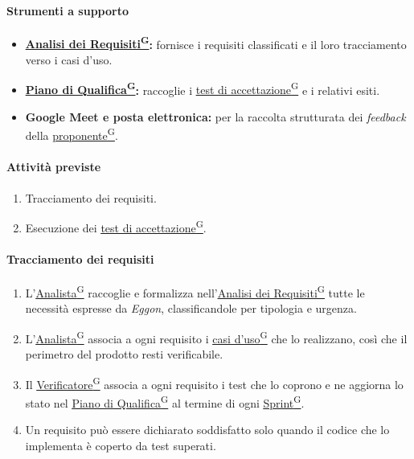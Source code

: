\documentclass[a4paper,12pt]{article}
\providecommand{\glslink}[2]{\href{https://alittlebyte-19.github.io/Documentazione/glossario.html\#gls-#1}{\underline{#2}\textsuperscript{\scriptsize G}}}
\begin{document}
\paragraph{Strumenti a supporto}
\begin{itemize}
    \item \textbf{\glslink{analisi-dei-requisiti-adr}{Analisi dei Requisiti}:} fornisce i requisiti classificati e il loro tracciamento verso i casi d'uso.
    \item \textbf{\glslink{piano-di-qualifica}{Piano di Qualifica}:} raccoglie i \glslink{test-di-accettazione}{test di accettazione} e i relativi esiti.
    \item \textbf{Google Meet e posta elettronica:} per la raccolta strutturata dei \textit{feedback} della \glslink{committente-proponente}{proponente}.
\end{itemize}

\paragraph{Attività previste}
\begin{enumerate}
    \item Tracciamento dei requisiti.
    \item Esecuzione dei \glslink{test-di-accettazione}{test di accettazione}.
\end{enumerate}

\paragraph{Tracciamento dei requisiti}
\begin{enumerate}
    \item L'\glslink{analista}{Analista} raccoglie e formalizza nell'\glslink{analisi-dei-requisiti-adr}{Analisi dei Requisiti} tutte le necessità espresse da \textit{Eggon}, classificandole per tipologia e urgenza.
    \item L'\glslink{analista}{Analista} associa a ogni requisito i \glslink{caso-d-uso-uc}{casi d'uso} che lo realizzano, così che il perimetro del prodotto resti verificabile.
    \item Il \glslink{verificatore}{Verificatore} associa a ogni requisito i test che lo coprono e ne aggiorna lo stato nel \glslink{piano-di-qualifica}{Piano di Qualifica} al termine di ogni \glslink{sprint}{Sprint}.
    \item Un requisito può essere dichiarato soddisfatto solo quando il codice che lo implementa è coperto da test superati.
\end{enumerate}
\end{document}
